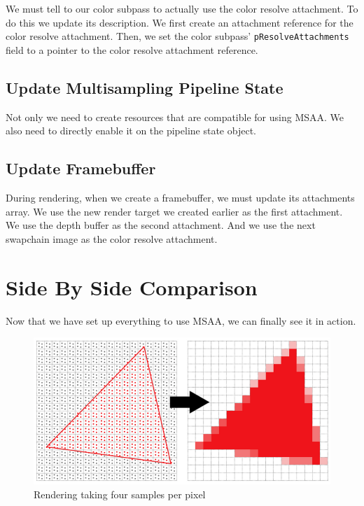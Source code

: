 We must tell to our color subpass to actually use the color resolve attachment.
To do this we update its description.
We first create an attachment reference for the color resolve attachment.
Then, we set the color subpass' \texttt{pResolveAttachments} field
to a pointer to the color resolve attachment reference.

\begin{minipage}{\linewidth}{\noindent}
    
\end{minipage}

\subsection{Update Multisampling Pipeline State}

Not only we need to create resources that are compatible for using MSAA.
We also need to directly enable it on the pipeline state object.

\begin{minipage}{\linewidth}{\noindent}
    
\end{minipage}

\subsection{Update Framebuffer}

During rendering, when we create a framebuffer, we must update
its attachments array.
We use the new render target we created earlier as the first attachment.
We use the depth buffer as the second attachment.
And we use the next swapchain image as the color resolve attachment.

\section{Side By Side Comparison}

Now that we have set up everything to use MSAA, we can finally see
it in action.

\begin{figure}[H]
    \centering
    \includegraphics[scale=0.62]{images/ChMSAA/FourSamplesPerPixel.png}
    \caption{Rendering taking four samples per pixel}
    \label{fig::FourSamplesPerPixel}
\end{figure}
